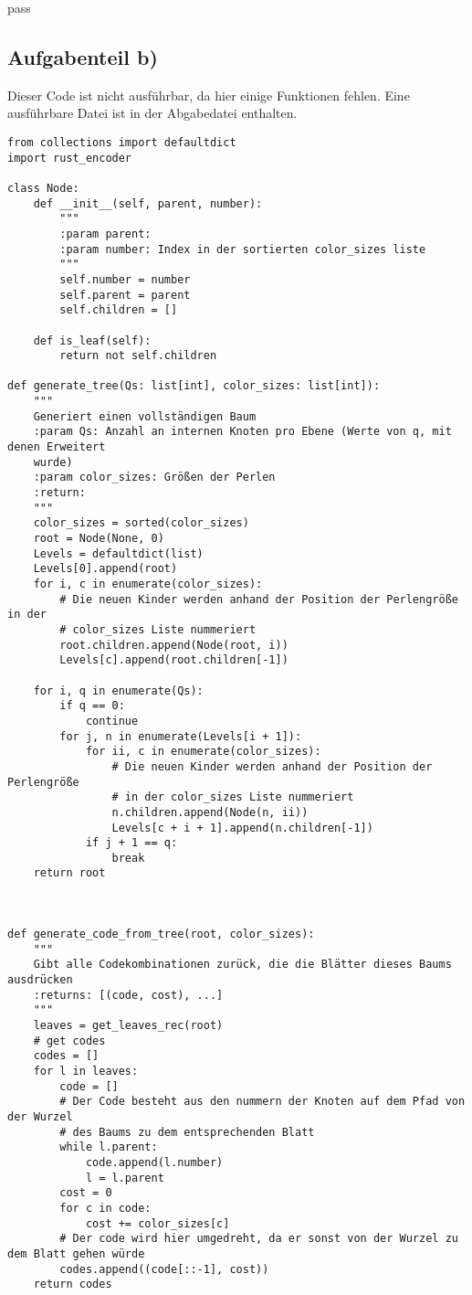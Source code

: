 pass\documentclass[a4paper,10pt,ngerman]{scrartcl}
\begin{document}
    \subsection{Aufgabenteil b)}
    Dieser Code ist nicht ausführbar, da hier einige Funktionen fehlen.
    Eine ausführbare Datei ist in der Abgabedatei enthalten.
    \begin{verbatim}
from collections import defaultdict
import rust_encoder

class Node:
    def __init__(self, parent, number):
        """
        :param parent:
        :param number: Index in der sortierten color_sizes liste
        """
        self.number = number
        self.parent = parent
        self.children = []

    def is_leaf(self):
        return not self.children

def generate_tree(Qs: list[int], color_sizes: list[int]):
    """
    Generiert einen vollständigen Baum
    :param Qs: Anzahl an internen Knoten pro Ebene (Werte von q, mit denen Erweitert
    wurde)
    :param color_sizes: Größen der Perlen
    :return:
    """
    color_sizes = sorted(color_sizes)
    root = Node(None, 0)
    Levels = defaultdict(list)
    Levels[0].append(root)
    for i, c in enumerate(color_sizes):
        # Die neuen Kinder werden anhand der Position der Perlengröße in der
        # color_sizes Liste nummeriert
        root.children.append(Node(root, i))
        Levels[c].append(root.children[-1])

    for i, q in enumerate(Qs):
        if q == 0:
            continue
        for j, n in enumerate(Levels[i + 1]):
            for ii, c in enumerate(color_sizes):
                # Die neuen Kinder werden anhand der Position der Perlengröße
                # in der color_sizes Liste nummeriert
                n.children.append(Node(n, ii))
                Levels[c + i + 1].append(n.children[-1])
            if j + 1 == q:
                break
    return root



def generate_code_from_tree(root, color_sizes):
    """
    Gibt alle Codekombinationen zurück, die die Blätter dieses Baums ausdrücken
    :returns: [(code, cost), ...]
    """
    leaves = get_leaves_rec(root)
    # get codes
    codes = []
    for l in leaves:
        code = []
        # Der Code besteht aus den nummern der Knoten auf dem Pfad von der Wurzel
        # des Baums zu dem entsprechenden Blatt
        while l.parent:
            code.append(l.number)
            l = l.parent
        cost = 0
        for c in code:
            cost += color_sizes[c]
        # Der code wird hier umgedreht, da er sonst von der Wurzel zu dem Blatt gehen würde
        codes.append((code[::-1], cost))
    return codes



\end{verbatim}
\end{document}
